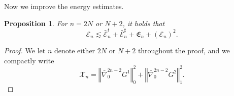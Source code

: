 \documentclass[a4paper,reqno,11pt]{amsart}
\numberwithin{equation}{section}
\providecommand{\norm}[1]{\left\Vert#1\right\Vert}
\providecommand{\ns}[1]{\norm{#1}^2}
\providecommand{\norm}[1]{\left\Vert#1\right\Vert}
\newtheorem{prop}[lem]{Proposition}
\begin{document}
Now we improve the energy estimates.

\begin{prop}\label{e2nic}
For $n=2N$ or $N+2$, it holds that
\begin{equation}\label{e2n}
{\mathcal{E}}_{n}  \lesssim
\bar{\mathcal{E}}_n^t   + \bar{\mathcal{E}}_n^\sharp   +\mathfrak{E}_{n}+ (\mathcal{E}_{n} )^{2}.
\end{equation}
\end{prop}
\begin{proof}
We let $n$ denote either $2N$ or $N+2$ throughout the proof, and we compactly write
\begin{equation}\label{n112}
 \mathcal{X}_n =   \ns{ \bar{\nabla}^{2n-2}_0  G^1}_{0} +\ns{ \bar{\nabla}^{2n-2}_0  G^2}_{1}   .
\end{equation}


\end{proof}
\end{document}
